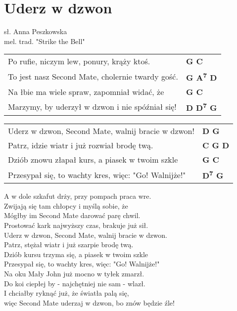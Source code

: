 \section{Uderz w dzwon}

sł. Anna Peszkowska\\
mel. trad. "Strike the Bell"\\

\vspace{2em}
\begin{tabular}{@{}p{10cm}@{}l@{}}
Po rufie, niczym lew, ponury, krąży ktoś. & \bfseries G C\\
To jest nasz Second Mate, cholernie twardy gość. & \bfseries G A\textsuperscript{7} D\\
Na łbie ma wiele spraw, zapomniał widać, że & \bfseries G C\\
Marzymy, by uderzył w dzwon i nie spóźniał się! & \bfseries D D\textsuperscript{7} G\\
\end{tabular}

\begin{tabular}{@{}p{10cm}@{}l@{}}
Uderz w dzwon, Second Mate, walnij bracie w dzwon! & \bfseries D G\\
Patrz, idzie wiatr i już rozwiał brodę twą. & \bfseries C G D\\
Dziób znowu złapał kurs, a piasek w twoim szkle & \bfseries G C\\
Przesypał się, to wachty kres, więc: "Go! Walnijże!" & \bfseries D\textsuperscript{7} G\\
\end{tabular}

\vspace{1em}
A w dole szkafut drży, przy pompach praca wre. \\
Zwijają się tam chłopcy i myślą sobie, że \\
Mógłby im Second Mate darować parę chwil. \\
Prostować kark najwyższy czas, brakuje już sił. \\

Uderz w dzwon, Second Mate, walnij bracie w dzwon. \\
Patrz, stężał wiatr i już szarpie brodę twą. \\
Dziób kursu trzyma się, a piasek w twoim szkle \\
Przesypał się, to wachty kres, więc: "Go! Walnijże!" \\

Na oku Mały John już mocno w tyłek zmarzł. \\
Do koi ciepłej by - najchętniej nie sam - wlazł. \\
I chciałby ryknąć już, że światła palą się, \\
więc Second Mate uderzaj w dzwon, bo znów będzie źle! \\

